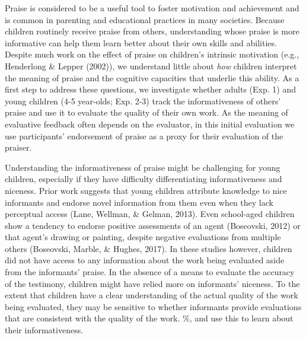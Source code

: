 \documentclass[10pt, letterpaper]{article}
\begin{document}
Praise is considered to be a useful tool to foster motivation and
achievement and is common in parenting and educational practices in many
societies. Because children routinely receive praise from others,
understanding whose praise is more informative can help them learn
better about their own skills and abilities. Despite much work on the
effect of praise on children's intrinsic motivation (e.g., Henderlong \&
Lepper (2002)), we understand little about \textit{how} children
interpret the meaning of praise and the cognitive capacities that
underlie this ability. As a first step to address these questions, we
investigate whether adults (Exp. 1) and young children (4-5 year-olds;
Exp. 2-3) track the informativeness of others' praise and use it to
evaluate the quality of their own work. As the meaning of evaluative
feedback often depends on the evaluator, in this initial evaluation we
use participants' endorsement of praise as a proxy for their evaluation
of the praiser.

Understanding the informativeness of praise might be challenging for
young children, especially if they have difficulty differentiating
informativeness and niceness. Prior work suggests that young children
attribute knowledge to nice informants and endorse novel information
from them even when they lack perceptual access (Lane, Wellman, \&
Gelman, 2013). Even school-aged children show a tendency to endorse
positive assessments of an agent (Boseovski, 2012) or that agent's
drawing or painting, despite negative evaluations from multiple others
(Boseovski, Marble, \& Hughes, 2017). In these studies however, children
did not have access to any information about the work being evaluated
aside from the informants' praise. In the absence of a means to evaluate
the accuracy of the testimony, children might have relied more on
informants' niceness. To the extent that children have a clear
understanding of the actual quality of the work being evaluated, they
may be sensitive to whether informants provide evaluations that are
consistent with the quality of the work. \%, and use this to learn about
their informativeness.
\end{document}
